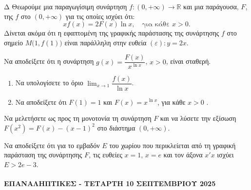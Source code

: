 \begin{thema}{Δ}
Θεωρούμε μια παραγωγίσιμη συνάρτηση $f: (0, +\infty) \to \mathbb{R}$ και μια παράγουσα, $F$, της $f$ στο $(0, +\infty)$ για τις οποίες ισχύει ότι:
\[
x f(x) = 2F(x)\ln x, \quad \text{για κάθε } x > 0.
\]
Δίνεται ακόμα ότι η εφαπτομένη της γραφικής παράστασης της συνάρτησης $f$ στο σημείο $M\bigl(1, f(1)\bigr)$ είναι παράλληλη στην ευθεία $(\varepsilon)\colon y = 2x$.
\begin{erwthma}
    \item Να αποδείξετε ότι η συνάρτηση $g(x) = \dfrac{F(x)}{x^{\ln x}}$, $x > 0$, είναι σταθερή. 

    \item
    \begin{enumerate}[label=\roman*)]
        \item Να υπολογίσετε το όριο $\displaystyle\lim_{x \to 1} \dfrac{f(x)}{\ln x}$.
        \item Να αποδείξετε ότι $F(1) = 1$ και $F(x) = x^{\ln x}$, για κάθε $x > 0$ .
    \end{enumerate}

    \item Να μελετήσετε ως προς τη μονοτονία τη συνάρτηση $F$ και να λύσετε την εξίσωση $F(x^2) = F(x) - (x-1)^2$ στο διάστημα $(0, +\infty)$. 

    \item Να αποδείξετε ότι για το εμβαδόν $E$ του χωρίου που περικλείεται από τη γραφική παράσταση της συνάρτησης $F$, τις ευθείες $x = 1$, $x = e$ και τον άξονα $x'x$ ισχύει $E > 2e - 3$. 
\end{erwthma}
\end{thema}


\paragraph{ΕΠΑΝΑΛΗΠΤΙΚΕΣ - ΤΕΤΑΡΤΗ 10 ΣΕΠΤΕΜΒΡΙΟΥ 2025}

